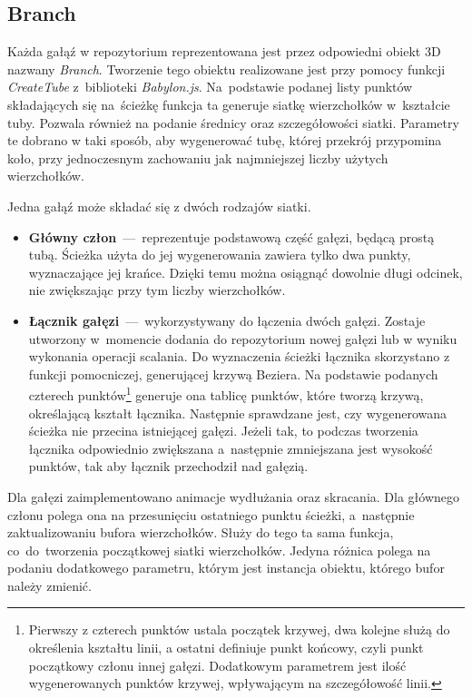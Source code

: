 \documentclass[12pt,a4paper,polish,thesis]{dcsbook}
\begin{document}
{	\subsection{Branch}
	Każda gałąź w repozytorium reprezentowana jest przez odpowiedni obiekt 3D nazwany \textit{Branch}. Tworzenie tego obiektu realizowane jest przy pomocy funkcji \textit{CreateTube} z~biblioteki \textit{Babylon.js}. Na~podstawie podanej listy punktów składających się na~ścieżkę funkcja ta generuje siatkę wierzchołków w~kształcie tuby. Pozwala również na podanie średnicy oraz szczegółowości siatki. Parametry te dobrano w taki sposób, aby wygenerować tubę, której przekrój przypomina koło, przy jednoczesnym zachowaniu jak najmniejszej liczby użytych wierzchołków. 
	
	Jedna gałąź może składać się z dwóch rodzajów siatki. 
	\begin{itemize}
		\item \textbf{Główny człon}~---~reprezentuje podstawową część gałęzi, będącą prostą tubą. Ścieżka użyta do jej wygenerowania zawiera tylko dwa punkty, wyznaczające jej krańce. Dzięki temu można osiągnąć dowolnie długi odcinek, nie zwiększając przy tym liczby wierzchołków.
		
		\item \textbf{Łącznik gałęzi}~---~wykorzystywany do łączenia dwóch gałęzi. Zostaje utworzony w~momencie dodania do repozytorium nowej gałęzi lub w wyniku wykonania operacji scalania. Do wyznaczenia ścieżki łącznika skorzystano z funkcji pomocniczej, generującej krzywą Beziera. Na podstawie podanych czterech punktów\footnote{Pierwszy z czterech punktów ustala początek krzywej, dwa kolejne służą do określenia kształtu linii, a ostatni definiuje punkt końcowy, czyli punkt początkowy członu innej gałęzi. Dodatkowym parametrem jest ilość wygenerowanych punktów krzywej, wpływającym na szczegółowość linii.} generuje ona tablicę punktów, które tworzą krzywą, określającą kształt łącznika. Następnie sprawdzane jest, czy wygenerowana ścieżka nie przecina istniejącej gałęzi. Jeżeli tak, to podczas tworzenia łącznika odpowiednio zwiększana a~następnie zmniejszana jest wysokość punktów, tak aby łącznik przechodził nad gałęzią.
		
	\end{itemize}

	Dla gałęzi zaimplementowano animacje wydłużania oraz skracania. Dla głównego członu polega ona na przesunięciu ostatniego punktu ścieżki, a~następnie zaktualizowaniu bufora wierzchołków. Służy do tego ta sama funkcja, co~do~tworzenia początkowej siatki wierzchołków. Jedyna różnica polega na podaniu dodatkowego parametru, którym jest instancja obiektu, którego bufor należy zmienić. 
	
}
\end{document}
